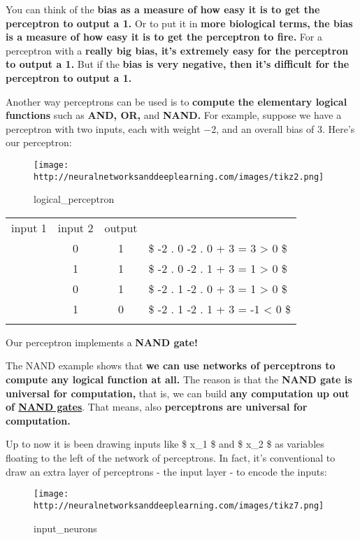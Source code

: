 \documentclass[]{article}
\begin{document}
You can think of the \textbf{bias as a measure of how easy it is to get
the perceptron to output a 1.} Or to put it in \textbf{more biological
terms, the bias is a measure of how easy it is to get the perceptron to
fire.} For a perceptron with a \textbf{really big bias, it's extremely
easy for the perceptron to output a 1.} But if the \textbf{bias is very
negative, then it's difficult for the perceptron to output a 1.}

Another way perceptrons can be used is to \textbf{compute the elementary
logical functions} such as \textbf{AND, OR,} and \textbf{NAND.} For
example, suppose we have a perceptron with two inputs, each with weight
−2, and an overall bias of 3. Here's our perceptron:

\begin{figure}[htbp]
\centering
\texttt{[image: http://neuralnetworksanddeeplearning.com/images/tikz2.png]}
\caption{logical\_perceptron}
\end{figure}

\begin{longtable}[c]{@{}cccl@{}}
\toprule\addlinespace
input 1 & input 2 & output &
\\\addlinespace
\midrule\endhead
0 & 0 & 1 & \$ -2 . 0 -2 . 0 + 3 = 3 \textgreater{} 0 \$
\\\addlinespace
0 & 1 & 1 & \$ -2 . 0 -2 . 1 + 3 = 1 \textgreater{} 0 \$
\\\addlinespace
1 & 0 & 1 & \$ -2 . 1 -2 . 0 + 3 = 1 \textgreater{} 0 \$
\\\addlinespace
1 & 1 & 0 & \$ -2 . 1 -2 . 1 + 3 = -1 \textless{} 0 \$
\\\addlinespace
\bottomrule
\end{longtable}

Our perceptron implements a \textbf{NAND gate!}

The NAND example shows that \textbf{we can use networks of perceptrons
to compute any logical function at all.} The reason is that the
\textbf{NAND gate is universal for computation,} that is, we can build
\textbf{any computation up out of
\href{https://en.wikipedia.org/wiki/NAND_logic}{NAND gates}}. That
means, also \textbf{perceptrons are universal for computation.}

Up to now it is been drawing inputs like \$ x\_1 \$ and \$ x\_2 \$ as
variables floating to the left of the network of perceptrons. In fact,
it's conventional to draw an extra layer of perceptrons - the input
layer - to encode the inputs:

\begin{figure}[htbp]
\centering
\texttt{[image: http://neuralnetworksanddeeplearning.com/images/tikz7.png]}
\caption{input\_neurons}
\end{figure}
\end{document}
